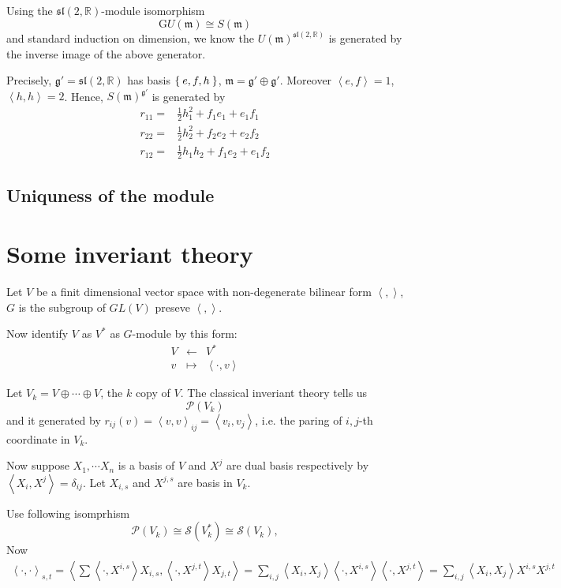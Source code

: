 \documentclass[12pt]{article}
\def\bR{{\mathbb{R}}}
\def\inn#1#2{\left\langle{#1},{#2}\right\rangle}
\def\asl{\mathfrak{sl}}
\def\fgg{\mathfrak{g}}
\def\css{\mathcal{S}}
\def\cpp{\mathcal{P}}
\def\fmm{\mathfrak{m}}
\def\Gr{\mathrm{G}}
\begin{document}
Using the $\asl(2,\bR)$-module isomorphism 
\[
\Gr U(\fmm) \cong S(\fmm)
\]
and standard induction on dimension, we know the $U(\fmm)^{\asl(2,\bR)}$
is generated by  the inverse image of the above generator.

Precisely, $\fgg'=\asl(2,\bR)$ has basis $\Set{e,f,h}$, 
$\fmm = \fgg'\oplus \fgg'$.
Moreover $\inn{e}{f} = 1$, $\inn{h}{h}=2$.  
Hence, $S(\fmm)^{\fgg'}$ is generated by 
\begin{align*}
r_{11} = & \frac{1}{2} h_1^2 + f_1e_1 + e_1f_1 \\
r_{22} = & \frac{1}{2} h_2^2 + f_2e_2 + e_2f_2 \\
r_{12} = & \frac{1}{2} h_1h_2 + f_1e_2 + e_1f_2  
\end{align*}





\subsection{Uniquness of  the module}



\appendix
\section{Some inveriant theory}
Let $V$ be a finit dimensional  vector space 
with non-degenerate bilinear form $\inn{}{}$, 
$G$ is the subgroup of $GL(V)$ preseve $\inn{}{}$. 

Now identify $V$ as $V^*$ as $G$-module by this form:
\[
\begin{matrix}
V &\leftarrow& V^*\\
v & \mapsto & \inn{\cdot}{v}
\end{matrix}
\] 

Let $V_k = V\oplus \cdots \oplus V$, the $k$ copy of $V$. 
The classical inveriant theory tells us 
\[
\cpp(V_k) 
\]
and it generated by $r_{ij}(v) = \inn{v}{v}_{ij}= \inn{v_i}{v_j}$,
i.e. the paring of $i,j$-th 
coordinate in $V_k$.

Now suppose $X_1, \cdots X_n$ is a basis of $V$ and 
$X^j$ are dual basis respectively by $\inn{X_i}{X^j} = \delta_{ij}$.
Let $X_{i,s}$ and $X^{j,s}$ are basis in $V_k$. 

Use following isomprhism
\[
\cpp(V_k) \cong \css(V_k^*) \cong \css(V_k),
\]
Now
\[
\begin{split}
\inn{\cdot}{\cdot}_{s,t} = \inn{\sum \inn{\cdot}{X^{i,s}}X_{i,s}}{\inn{\cdot}{X^{j,t}}X_{j,t}} = \sum_{i,j} \inn{X_{i}}{X_{j}}\inn{\cdot}{X^{i,s}}\inn{\cdot}{X^{j,t}}
=\sum_{i,j} \inn{X_i}{X_j} X^{i,s}X^{j,t}
\end{split}
\]
\end{document}
